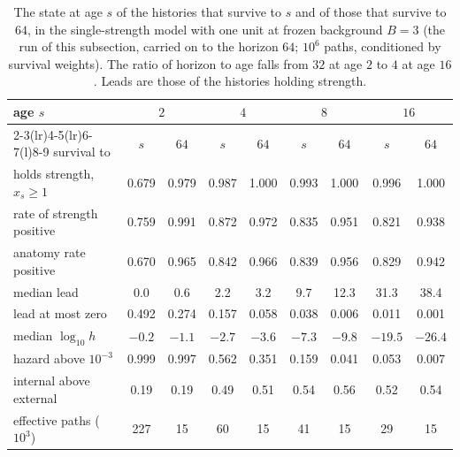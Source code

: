 \begin{table}[ht]
\centering\small
\begin{tabular}{@{}lcccccccc@{}}
\toprule
age $s$ & \multicolumn{2}{c}{$2$} & \multicolumn{2}{c}{$4$} & \multicolumn{2}{c}{$8$} & \multicolumn{2}{c}{$16$}\\
\cmidrule(lr){2-3}\cmidrule(lr){4-5}\cmidrule(lr){6-7}\cmidrule(l){8-9}
survival to & $s$ & $64$ & $s$ & $64$ & $s$ & $64$ & $s$ & $64$\\
\midrule
holds strength, $x_s\ge1$ & 0.679 & 0.979 & 0.987 & 1.000 & 0.993 & 1.000 & 0.996 & 1.000\\
rate of strength positive & 0.759 & 0.991 & 0.872 & 0.972 & 0.835 & 0.951 & 0.821 & 0.938\\
anatomy rate positive & 0.670 & 0.965 & 0.842 & 0.966 & 0.839 & 0.956 & 0.829 & 0.942\\
median lead & 0.0 & 0.6 & 2.2 & 3.2 & 9.7 & 12.3 & 31.3 & 38.4\\
lead at most zero & 0.492 & 0.274 & 0.157 & 0.058 & 0.038 & 0.006 & 0.011 & 0.001\\
median $\log_{10}h$ & $-0.2$ & $-1.1$ & $-2.7$ & $-3.6$ & $-7.3$ & $-9.8$ & $-19.5$ & $-26.4$\\
hazard above $10^{-3}$ & 0.999 & 0.997 & 0.562 & 0.351 & 0.159 & 0.041 & 0.053 & 0.007\\
internal above external & 0.19 & 0.19 & 0.49 & 0.51 & 0.54 & 0.56 & 0.52 & 0.54\\
effective paths ($10^3$) & 227 & 15 & 60 & 15 & 41 & 15 & 29 & 15\\
\bottomrule
\end{tabular}
\caption{\small The state at age $s$ of the histories that survive to
$s$ and of those that survive to $64$, in the single-strength model with
one unit at frozen background $B=3$ (the run of this subsection, carried on to
the horizon $64$; $10^6$ paths, conditioned by survival weights). The
ratio of horizon to age falls from $32$ at age $2$ to $4$ at age $16$.
Leads are those of the histories holding strength.}
\label{gr:tab:forward}
\end{table}

